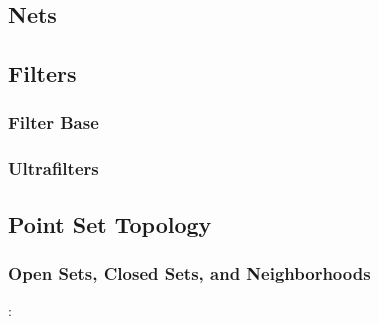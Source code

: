 \subsection{Nets}






\subsection{Filters}





\subsubsection{Filter Base}





\subsubsection{Ultrafilters}





\subsection{Point Set Topology}
\subsubsection{Open Sets, Closed Sets, and Neighborhoods}







:

